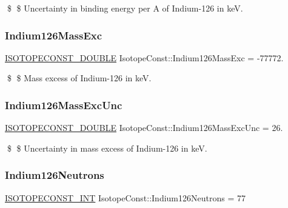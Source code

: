 \$ \$ Uncertainty in binding energy per A of Indium-\/126 in keV. \mbox{\label{group___isotope_const-_indium-_in126_gadceffa005202445fd74aa7d9e6519890}} 
\subsubsection{\texorpdfstring{Indium126\+Mass\+Exc}{Indium126MassExc}}
{\footnotesize\ttfamily \mbox{\hyperlink{group___isotope_const-_macros_ga8f45a7272ce02c0b4c65c44636ed719a}{I\+S\+O\+T\+O\+P\+E\+C\+O\+N\+S\+T\+\_\+\+D\+O\+U\+B\+LE}} Isotope\+Const\+::\+Indium126\+Mass\+Exc = -\/77772.}

\$ \$ Mass excess of Indium-\/126 in keV. \mbox{\label{group___isotope_const-_indium-_in126_ga70fbf0f6803dabcda4fa9b51f8153eb5}} 
\subsubsection{\texorpdfstring{Indium126\+Mass\+Exc\+Unc}{Indium126MassExcUnc}}
{\footnotesize\ttfamily \mbox{\hyperlink{group___isotope_const-_macros_ga8f45a7272ce02c0b4c65c44636ed719a}{I\+S\+O\+T\+O\+P\+E\+C\+O\+N\+S\+T\+\_\+\+D\+O\+U\+B\+LE}} Isotope\+Const\+::\+Indium126\+Mass\+Exc\+Unc = 26.}

\$ \$ Uncertainty in mass excess of Indium-\/126 in keV. \mbox{\label{group___isotope_const-_indium-_in126_ga8e0544a747b98f65779bb0ff62952c94}} 
\subsubsection{\texorpdfstring{Indium126\+Neutrons}{Indium126Neutrons}}
{\footnotesize\ttfamily \mbox{\hyperlink{group___isotope_const-_macros_ga5f18360b3e99483a35c32d789e62621c}{I\+S\+O\+T\+O\+P\+E\+C\+O\+N\+S\+T\+\_\+\+I\+NT}} Isotope\+Const\+::\+Indium126\+Neutrons = 77}

